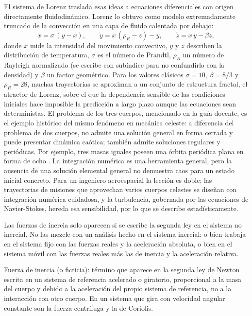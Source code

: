 \documentclass[10pt,openany]{book}
\begin{document}
El sistema de Lorenz traslada esas ideas a ecuaciones diferenciales con origen directamente fluidodinámico. Lorenz lo obtuvo como modelo extremadamente truncado de la convección en una capa de fluido calentada por debajo:
\begin{equation}
\dot x = \sigma\,(y - x),\qquad \dot y = x\,(\rho_R - z) - y,\qquad \dot z = x\,y - \beta z, \label{eq:c02-lorenz}
\end{equation}
donde \(x\) mide la intensidad del movimiento convectivo, \(y\) y \(z\) describen la distribución de temperatura, \(\sigma\) es el número de Prandtl, \(\rho_R\) un número de Rayleigh normalizado (se escribe con subíndice para no confundirlo con la densidad) y \(\beta\) un factor geométrico. Para los valores clásicos \(\sigma = 10\), \(\beta = 8/3\) y \(\rho_R = 28\), muchas trayectorias se aproximan a un conjunto de estructura fractal, el atractor de Lorenz, sobre el que la dependencia sensible de las condiciones iniciales hace imposible la predicción a largo plazo aunque las ecuaciones sean deterministas. El problema de los tres cuerpos, mencionado en la guía docente, es el ejemplo histórico del mismo fenómeno en mecánica celeste: a diferencia del problema de dos cuerpos, no admite una solución general en forma cerrada y puede presentar dinámica caótica; también admite soluciones regulares y periódicas. Por ejemplo, tres masas iguales poseen una órbita periódica plana en forma de ocho \cite{CHENCINER-MONTGOMERY}. La integración numérica es una herramienta general, pero la ausencia de una solución elemental general no demuestra caos para un estado inicial concreto. Para un ingeniero aeroespacial la lección es doble: las trayectorias de misiones que aprovechan varios cuerpos celestes se diseñan con integración numérica cuidadosa, y la turbulencia, gobernada por las ecuaciones de Navier-Stokes, hereda esa sensibilidad, por lo que se describe estadísticamente.

\begin{tcolorbox}[title={Consejo}, studiumtip, breakable]

Las fuerzas de inercia solo aparecen si se escribe la segunda ley en el sistema no inercial. No las mezcle con un análisis hecho en el sistema inercial: o bien trabaja en el sistema fijo con las fuerzas reales y la aceleración absoluta, o bien en el sistema móvil con las fuerzas reales más las de inercia y la aceleración relativa.
\end{tcolorbox}

\begin{tcolorbox}[title={Definición}, studiumdef, breakable]

Fuerza de inercia (o ficticia): término que aparece en la segunda ley de Newton escrita en un sistema de referencia acelerado o giratorio, proporcional a la masa del cuerpo y debido a la aceleración del propio sistema de referencia, no a la interacción con otro cuerpo. En un sistema que gira con velocidad angular constante son la fuerza centrífuga y la de Coriolis.
\end{tcolorbox}
\end{document}
